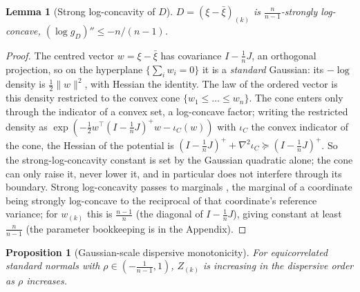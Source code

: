\documentclass[11pt]{article}
\newtheorem{proposition}{Proposition}
\newtheorem{lemma}{Lemma}
\begin{document}
\begin{lemma}[Strong log-concavity of $D$]\label{lem:slc}
$D=(\xi-\bar\xi)_{(k)}$ is $\tfrac{n}{n-1}$-strongly log-concave, $(\log g_D)''\le -n/(n-1)$.
\end{lemma}

\begin{proof}
The centred vector $w=\xi-\bar\xi$ has covariance $I-\tfrac1n J$, an orthogonal projection, so on the
hyperplane $\{\sum_i w_i=0\}$ it is a \emph{standard} Gaussian: its $-\log$ density is $\tfrac12\|w\|^2$,
with Hessian the identity. The law of the ordered vector is this density restricted to the convex cone
$\{w_1\le\dots\le w_n\}$. The cone enters only through the indicator of a convex set, a log-concave
factor; writing the restricted density as $\exp(-\tfrac12 w^\top(I-\tfrac1nJ)^{+}w-\iota_C(w))$ with
$\iota_C$ the convex indicator of the cone, the Hessian of the potential is
$(I-\tfrac1nJ)^{+}+\nabla^2\iota_C\succeq(I-\tfrac1nJ)^{+}$. So the strong-log-concavity constant is
set by the Gaussian quadratic alone; the cone can only raise it, never lower it, and in particular
does not interfere through its boundary. Strong log-concavity passes to marginals
\citep{prekopa1973,brascamplieb1976,saumard2014}, the marginal of a coordinate being strongly
log-concave to the reciprocal of that coordinate's reference variance; for $w_{(k)}$ this is
$\tfrac{n-1}n$ (the diagonal of $I-\tfrac1nJ$), giving constant at least $\tfrac n{n-1}$ (the
parameter bookkeeping is in the Appendix).
\end{proof}

\begin{proposition}[Gaussian-scale dispersive monotonicity]\label{prop:dispmon}
For equicorrelated standard normals with $\rho\in(-\tfrac1{n-1},1)$, $Z_{(k)}$ is increasing in the
dispersive order as $\rho$ increases.
\end{proposition}
\end{document}
